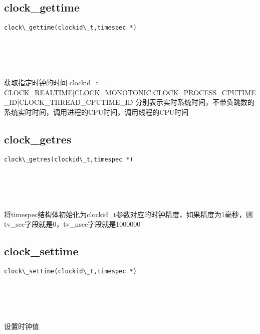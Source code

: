 \documentclass[10pt,a4paper]{article}
\begin{document}
\section{\color[rgb]{0.2,0.4,0.6}{时钟}}
\subsection{clock\_gettime}
\begin{spacing}{2.0}
\lstset{language=C,numbers=none}
\begin{lstlisting}
clock\_gettime(clockid\_t,timespec *)
\end{lstlisting}
{\large\color[rgb]{0.2,0.4,0.6}{clockid\_t:}} \\
{\large\color[rgb]{0.2,0.4,0.6}{*:}}
\paragraph{ \ \ }获取指定时钟的时间 clockid\_t = CLOCK\_REALTIME|CLOCK\_MONOTONIC|CLOCK\_PROCESS\_CPUTIME\_ID|CLOCK\_THREAD\_CPUTIME\_ID 分别表示实时系统时间，不带负跳数的系统实时时间，调用进程的CPU时间，调用线程的CPU时间
\end{spacing}

\subsection{clock\_getres}
\begin{spacing}{2.0}
\lstset{language=C,numbers=none}
\begin{lstlisting}
clock\_getres(clockid\_t,timespec *)
\end{lstlisting}
{\large\color[rgb]{0.2,0.4,0.6}{clockid\_t:}} \\
{\large\color[rgb]{0.2,0.4,0.6}{*:}}
\paragraph{ \ \ }将timespec结构体初始化为clockid\_t参数对应的时钟精度，如果精度为1毫秒，则tv\_sec字段就是0，tv\_nsec字段就是1000000
\end{spacing}

\subsection{clock\_settime}
\begin{spacing}{2.0}
\lstset{language=C,numbers=none}
\begin{lstlisting}
clock\_settime(clockid\_t,timespec *)
\end{lstlisting}
{\large\color[rgb]{0.2,0.4,0.6}{clockid\_t:}} \\
{\large\color[rgb]{0.2,0.4,0.6}{*:}}
\paragraph{ \ \ }设置时钟值
\end{spacing}
\end{document}
